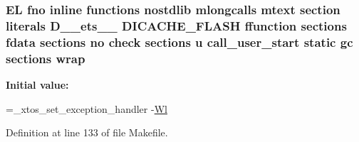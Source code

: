 \hypertarget{Makefile_a6b04d3dc9ff8a69521845b59ef6c33f1}{
\subsubsection[{wrap}]{\setlength{\rightskip}{0pt plus 5cm}E\-L fno inline functions nostdlib mlongcalls mtext section literals D\-\_\-\-\_\-ets\-\_\-\-\_\- D\-I\-C\-A\-C\-H\-E\-\_\-\-F\-L\-A\-S\-H ffunction sections fdata sections no check sections u call\-\_\-user\-\_\-start static gc sections wrap\hspace{0.3cm}{\ttfamily [static]}}}\label{Makefile_a6b04d3dc9ff8a69521845b59ef6c33f1}
{\bfseries Initial value\-:}
\begin{DoxyCode}
=\_xtos\_set\_exception\_handler 
    -\hyperlink{Makefile_a1af3a6ecef406b93f1a1db145b2cfd43}{Wl}
\end{DoxyCode}


Definition at line 133 of file Makefile.

